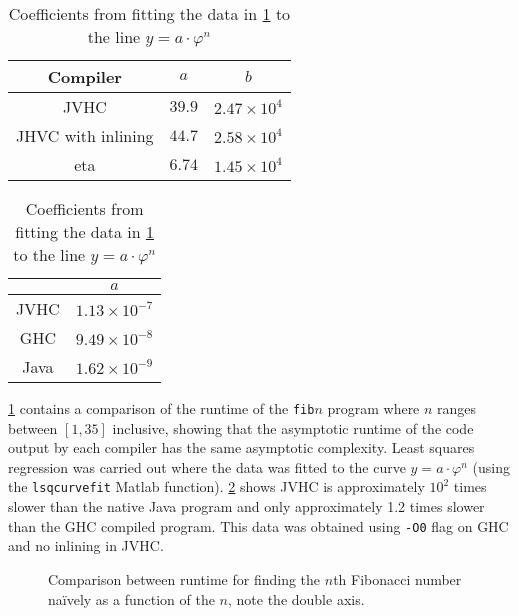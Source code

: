 \documentclass[float=false, crop=false]{standalone}
\newlength\gwidth
\newlength\gheight
\newcommand{\importMGraph}[3]{\setlength{\gwidth}{#2}\setlength{\gheight}{#3}{#1}}
\begin{document}
\begin{table}
  \centering
  \begin{minipage}{0.55\textwidth}
  \centering
  \begin{tabular}{ c | c c }
    Compiler& $a$ & $b$\\
    \hline
    JVHC & $39.9$ & $2.47 \times 10^{4}$ \\
    JHVC with inlining & $44.7$ & $2.58 \times 10^{4}$\\
    eta & $6.74$ & $1.45 \times 10^{4}$
  \end{tabular}
  \caption{Regression values for code size form data in \cref{plot:codeSize} to $y=a x+b$}
  \label{table:codeSize}
\end{minipage}\hfill
\begin{minipage}{0.42\textwidth}
  \centering
\begin{tabular}{c | c}
  & $a$\\
  \hline 
  JVHC & $1.13\times 10^{-7}$\\
  GHC & $9.49\times 10^{-8}$\\
  Java & $1.62 \times 10^{-9}$
\end{tabular}
\caption{Coefficients from fitting the data in \cref{plot:fibTiming} 
    to the line $y=a\cdot \varphi^n$}
  \label{table:fibCoef}
\end{minipage}

\end{table}

\cref{plot:fibTiming} contains a comparison of the runtime of the \texttt{fib}$n$ program where 
$n$ ranges between $[1,35]$ inclusive, showing that the asymptotic runtime of the code output
by each compiler has the same asymptotic complexity.
  Least squares regression was carried out where the data was fitted to the curve
  $y = a \cdot \varphi^n$ (using the \texttt{lsqcurvefit} Matlab function).
  \cref{table:fibCoef} shows
  JVHC is approximately $10^2$  times slower than the native
  Java program and only approximately 1.2 times slower than the GHC 
  compiled program.
  This data was obtained using \texttt{-O0} flag on GHC and no inlining
  in JVHC.

\begin{figure}
  \centering
  \importMGraph{plotFibRuntime}{0.93\textwidth}{0.4\textwidth}
  \caption{Comparison between runtime for finding the $n$th Fibonacci number na\"ively as a 
  function of the $n$, note the double axis.}
  \label{plot:fibTiming}
\end{figure}
\end{document}
